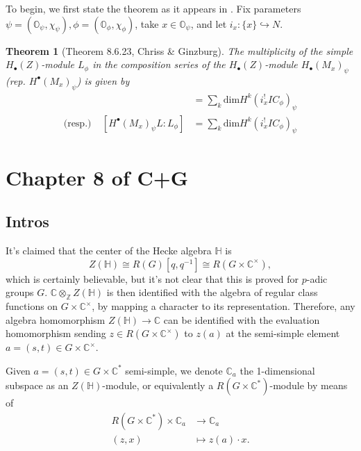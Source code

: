\documentclass{memoir}
\newcommand{\mb}{\mathbb}
\newcommand{\bc}{\mathbb{C}}
\newcommand{\bz}{\mathbb{Z}}
\newcommand{\tx}{\text}
\newcommand{\ten}{\otimes}
\newtheorem{theorem}{Theorem}[section]
\theoremstyle{definition}
\begin{document}
	To begin, we first state the theorem as it appears in \cite{Chr}.  
	Fix parameters $\psi=(\mb{O}_\psi, \chi_\psi), \phi=(\mb{O}_\phi, \chi_\phi)$, take $x\in\mb{O}_\psi$, and let $i_x:\{x\}\hookrightarrow N$.  
	
	\begin{theorem}[Theorem 8.6.23, Chriss \& Ginzburg]
		The multiplicity of the simple $H_\bullet(Z)$-module $L_\phi$ in the composition series of the $H_\bullet(Z)$-module $H_\bullet(M_x)_\psi$ (rep. $H^\bullet(M_x)_\psi$) is given by
		\begin{align*}
			[H_\bullet(M_x)_\psi L: L L_\phi]&=\sum_k\tx{dim}H^k(i_x^!IC_\phi)_\psi\\
			\tx{(resp.)} \ \ \ \ \ [H^\bullet(M_x)_\psi L : L_\phi]&=\sum_k\tx{dim}H^k(i_x^!IC_\phi)_\psi
		\end{align*}
	\end{theorem}

















	\section{Chapter 8 of C+G}
	
	
	
	\subsection{Intros}
	
	It's claimed that the center of the Hecke algebra $\mb{H}$ is 
	$$Z(\mb{H})\cong R(G)[q, q^{-1}]\cong R(G\times\bc^\times),$$
	which is certainly believable, but it's not clear that this is proved for $p$-adic groups $G$.  
	$\bc\ten_{\bz}Z(\mb{H})$ is then identified with the algebra of regular class functions on $G\times\bc^\times$, by mapping a character to its representation.  
	Therefore, any algebra homomorphism $Z(\mb{H})\to\bc$ can be identified with the evaluation homomorphism sending $z\in R(G\times\bc^\times)$ to $z(a)$ at the semi-simple element $a=(s, t)\in G\times\bc^\times$.  
	
	Given $a=(s, t)\in G\times\bc^\ast$ semi-simple, we denote $\bc_a$ the 1-dimensional subspace as an $Z(\mb{H})$-module, or equivalently a $R(G\times\bc^\ast)$-module by means of 
	\begin{align*}
		R(G\times\bc^\ast)\times\bc_a&\to\bc_a\\
		(z, x)&\mapsto z(a)\cdot x. 
	\end{align*}
	
\end{document}
